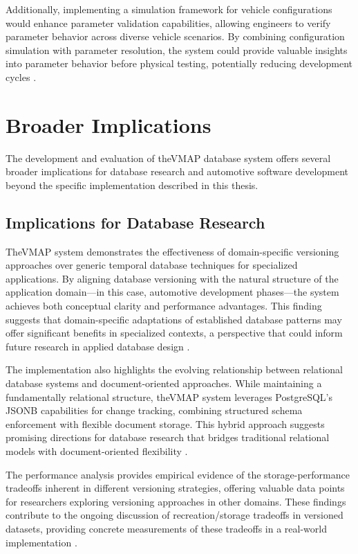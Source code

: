 Additionally, implementing a simulation framework for vehicle configurations would enhance parameter validation capabilities, allowing engineers to verify parameter behavior across diverse vehicle scenarios. By combining configuration simulation with parameter resolution, the system could provide valuable insights into parameter behavior before physical testing, potentially reducing development cycles \cite{staron2021automotive}.

\section{Broader Implications}
\label{sec:broader-implications}

The development and evaluation of the\ac{VMAP} database system offers several broader implications for database research and automotive software development beyond the specific implementation described in this thesis.

\subsection{Implications for Database Research}
\label{subsec:database-research-implications}

The\ac{VMAP} system demonstrates the effectiveness of domain-specific versioning approaches over generic temporal database techniques for specialized applications. By aligning database versioning with the natural structure of the application domain—in this case, automotive development phases—the system achieves both conceptual clarity and performance advantages. This finding suggests that domain-specific adaptations of established database patterns may offer significant benefits in specialized contexts, a perspective that could inform future research in applied database design \cite{bhattacherjee2015principles}.

The implementation also highlights the evolving relationship between relational database systems and document-oriented approaches. While maintaining a fundamentally relational structure, the\ac{VMAP} system leverages PostgreSQL's JSONB capabilities for change tracking, combining structured schema enforcement with flexible document storage. This hybrid approach suggests promising directions for database research that bridges traditional relational models with document-oriented flexibility \cite{obe2017postgresql}.

The performance analysis provides empirical evidence of the storage-performance tradeoffs inherent in different versioning strategies, offering valuable data points for researchers exploring versioning approaches in other domains. These findings contribute to the ongoing discussion of recreation/storage tradeoffs in versioned datasets, providing concrete measurements of these tradeoffs in a real-world implementation \cite{bhattacherjee2015principles}.

